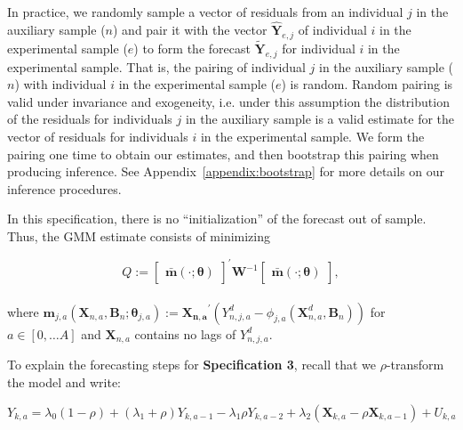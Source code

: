 \begin{enumerate}
\noindent In practice, we randomly sample a vector of residuals from an individual $j$ in the auxiliary sample ($n$) and pair it with the vector $\hat{\bm{Y}}_{e,j}$ of individual $i$ in the experimental sample ($e$) to form the forecast $\tilde{\bm{Y}}_{e,j}$ for individual $i$ in the experimental sample. That is, the pairing of individual $j$ in the auxiliary sample ($n$) with individual $i$ in the experimental sample ($e$) is random. Random pairing is valid under invariance and exogeneity, i.e. under this assumption the distribution of the residuals for individuals $j$ in the auxiliary sample is a valid estimate for the vector of residuals for individuals $i$ in the experimental sample. We form the pairing one time to obtain our estimates, and then bootstrap this pairing when producing inference. See Appendix~\ref{appendix:bootstrap} for more details on our inference procedures.
\end{enumerate}

\noindent In this specification, there is no ``initialization'' of the forecast out of sample. Thus, the GMM estimate consists of minimizing

\begin{equation}
Q :=  {\begin{bmatrix} {\bm{\bar{m}} \left( \cdot ; \bm{\theta} \right) }  \end{bmatrix}}^{'}
\bm{W} ^{-1}{\begin{bmatrix} {\bm{\bar{m}} \left( \cdot ; \bm{\theta} \right) }   \end{bmatrix}}, \label{eq:wlossspec2}
\end{equation}\\

\noindent where $\bm{m}_{j,a} \left( \bm{X}_{n,a}, \bm{B}_{n} ; \bm{\theta}_{j,a} \right) := {\bm{X_{n,a}}}^{'} \left( Y_{n,j,a}^d -   \phi_{j,a} \left( \bm{X}_{n,a}^d, \bm{B}_{n} \right) \right)$ for $a \in [0, \ldots A]$ and  $\bm{X}_{n,a}$ contains no lags of $Y_{n,j,a}^d$.

\noindent  To explain the forecasting steps for \textbf{Specification 3}, recall that we $\rho$-transform the model and write:

\begin{equation}
Y_{k,a} = \lambda_{0} \left( 1 - \rho \right) + \left( \lambda_{1} + \rho \right) Y_{k,a-1} - \lambda_{1} \rho Y_{k,a-2} + \lambda_{2} \left( \bm{X}_{k,a} - \rho \bm{X}_{k,a-1}  \right) + U_{k,a} \label{eq:rhotransform}
\end{equation}

